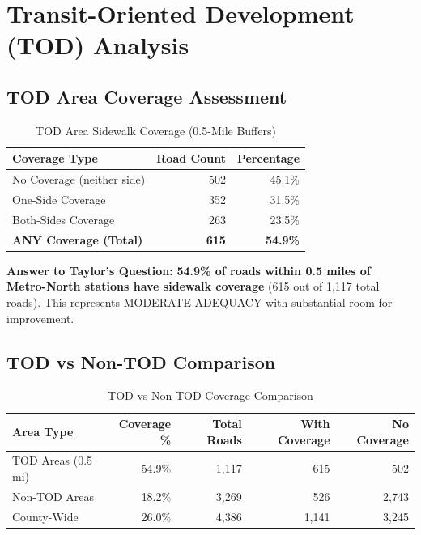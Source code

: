 \documentclass[11pt,letterpaper]{article}
\begin{document}
\section{Transit-Oriented Development (TOD) Analysis}

\subsection{TOD Area Coverage Assessment}

\begin{table}[H]
\centering
\begin{tabular}{@{}lrr@{}}
\toprule
\textbf{Coverage Type} & \textbf{Road Count} & \textbf{Percentage} \\
\midrule
No Coverage (neither side) & 502 & 45.1\% \\
One-Side Coverage & 352 & 31.5\% \\
Both-Sides Coverage & 263 & 23.5\% \\
\midrule
\textbf{ANY Coverage (Total)} & \textbf{615} & \textbf{54.9\%} \\
\bottomrule
\end{tabular}
\caption{TOD Area Sidewalk Coverage (0.5-Mile Buffers)}
\end{table}

\textbf{Answer to Taylor's Question:} \textbf{54.9\% of roads within 0.5 miles of Metro-North stations have sidewalk coverage} (615 out of 1,117 total roads). This represents MODERATE ADEQUACY with substantial room for improvement.

\subsection{TOD vs Non-TOD Comparison}

\begin{table}[H]
\centering
\begin{tabular}{@{}lrrrr@{}}
\toprule
\textbf{Area Type} & \textbf{Coverage \%} & \textbf{Total Roads} & \textbf{With Coverage} & \textbf{No Coverage} \\
\midrule
TOD Areas (0.5 mi) & 54.9\% & 1,117 & 615 & 502 \\
Non-TOD Areas & 18.2\% & 3,269 & 526 & 2,743 \\
County-Wide & 26.0\% & 4,386 & 1,141 & 3,245 \\
\bottomrule
\end{tabular}
\caption{TOD vs Non-TOD Coverage Comparison}
\end{table}
\end{document}
